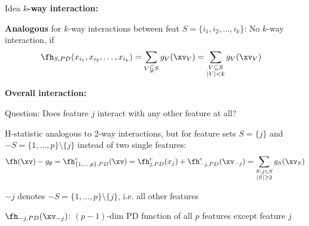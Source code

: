 \documentclass[10pt,compress,t,notes=noshow, xcolor=table]{beamer}
\begin{document}
\begin{framev}[align=top]{Idea }
\textbf{$k$-way interaction:}
\begin{itemizeM}
\item \textbf{Analogous} for $k$-way interactions between feat $S = \{i_1, i_2, \dots, i_k\}$: No $k$-way interaction, if
\begin{align*}
&\fh_{S, PD}(x_{i_1}, x_{i_2}, \dots, x_{i_k})
= \sum_{V \subsetneqq S} g_{V}(\xv_V)
= \sum_{\substack{V \subseteq S \\ |V| < k}} g_{V}(\xv_V)
\end{align*}
\end{itemizeM}
\pause
\textbf{Overall interaction:}
\begin{itemizeM}
\item Question: Does feature $j$ interact with any other feature at all?
\item[$\Rightarrow$] H-statistic analogous to 2-way interactions, but for feature sets $S = \{j\}$ and $-S = \{1, \dots, p\}\setminus \{j\}$ instead of two single features: \\
\pause
$$
\fh(\xv) - g_\emptyset
= \fh^c_{\{1, \dots, p\}, PD}(\xv)
= \fh^c_{j, PD}(x_j) + \fh^c_{-j, PD}(\xv_{-j})
= \sum_{\substack{S: j \in S \\ |S| \geq 2}} g_S(\xv_S)
$$
\begin{itemizeS}
\item $-j$ denotes $-S = \{1, \dots, p\}\setminus \{j\}$, i.e. all other features
\item $\fh_{-j, PD}(\xv_{-j})$: $(p - 1)$-dim PD function of all $p$ features except feature $j$
\end{itemizeS}
\end{itemizeM}
\end{framev}
\end{document}
